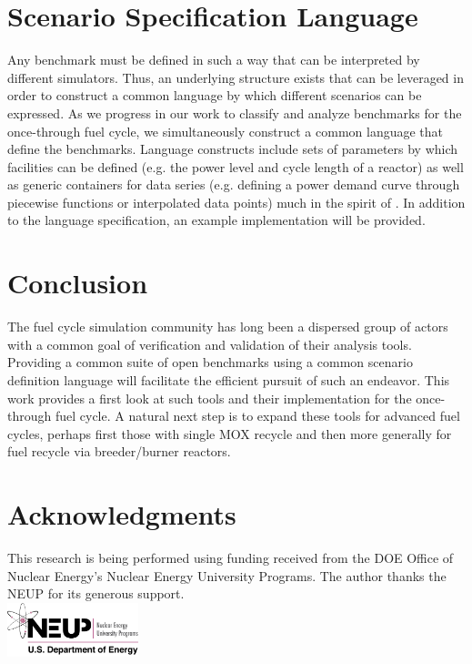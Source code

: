 \documentclass{anstrans}
\begin{document}
\section{Scenario Specification Language}
Any benchmark must be defined in such a way that can be interpreted by different
simulators. Thus, an underlying structure exists that can be leveraged in order
to construct a common language by which different scenarios can be expressed. As
we progress in our work to classify and analyze benchmarks for the once-through
fuel cycle, we simultaneously construct a common language that define the
benchmarks. Language constructs include sets of parameters by which facilities
can be defined (e.g. the power level and cycle length of a reactor) as well as
generic containers for data series (e.g. defining a power demand curve through
piecewise functions or interpolated data points) much in the spirit of
\cite{mattoon_generalized_2012}. In addition to the language specification, an
example implementation will be provided.

\section{Conclusion}
The fuel cycle simulation community has long been a dispersed group of actors
with a common goal of verification and validation of their analysis
tools. Providing a common suite of open benchmarks using a common scenario
definition language will facilitate the efficient pursuit of such an
endeavor. This work provides a first look at such tools and their implementation
for the once-through fuel cycle. A natural next step is to expand these tools
for advanced fuel cycles, perhaps first those with single MOX recycle and then
more generally for fuel recycle via breeder/burner reactors.

\section{Acknowledgments}
This research is being performed using funding received from the DOE Office of
Nuclear Energy's Nuclear Energy University Programs.  The author thanks the NEUP
for its generous support.\\ 
\includegraphics[width=1.5in]{neup_logo_large.jpg}


\end{document}
